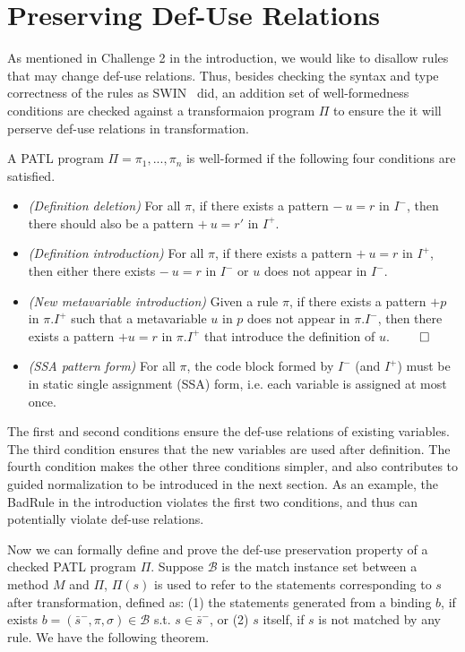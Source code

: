 \documentclass[letterpaper, USenglish]{lipics-v2016}
\newcommand{\PATL}{PATL\xspace}
\theoremstyle{plain}
\begin{document}

\section{Preserving Def-Use Relations}\label{sec:checker}
As mentioned in Challenge 2 in the introduction, we would like to
disallow rules that may change def-use relations. Thus, besides checking the syntax and type correctness of the rules as SWIN~\cite{Li:2015:STT:2678015.2682534} did, an addition set of well-formedness conditions are checked against a transformaion program $\Pi$ to ensure the it will perserve def-use relations in transformation.

\begin{definition}
A \PATL program $\Pi=\pi_1,...,\pi_n$ is well-formed if the following four conditions are satisfied.
\begin{itemize}
\item \textit{(Definition deletion)} For all $\pi$, if there exists a pattern $-~u=r$ in $I^-$, then there should also be a pattern $+~u=r'$ in $I^+$.
\item \textit{(Definition introduction)} For all $\pi$, if there exists a pattern $+~u=r$ in $I^+$, then either there exists $-~u=r$ in $I^-$ or $u$ does not appear in $I^-$.
\item \textit{(New metavariable introduction)} Given a rule $\pi$, if there exists a pattern $+p$ in $\pi.I^+$ such that a metavariable $u$ in $p$ does not appear in $\pi.I^-$, then there exists a pattern $+u=r$ in $\pi.I^+$ that introduce the definition of $u$. \hfill $\qed$
\item \textit{(SSA pattern form)} For all $\pi$, the code block formed
  by $I^-$ (and $I^+$) must be in static single
  assignment (SSA) form, i.e. each variable is assigned at most once.
\end{itemize}
\end{definition}

The first and second conditions ensure the def-use relations of
existing variables. The third condition ensures that the new variables are
used after definition. The fourth condition makes the other three
conditions simpler, and also contributes to guided normalization
to be introduced in the next section.
As an example, the BadRule in the introduction violates the first two conditions, and thus can potentially violate
def-use relations.

Now we can formally define and prove the def-use preservation property
of a checked \PATL program $\Pi$. Suppose $\mathcal{B}$ is the match
instance set between a method $M$ and $\Pi$, $\Pi(s)$ is used to refer
to the statements corresponding to $s$ after transformation, defined
as: (1) the statements generated from a binding $b$, if exists
$b=(\bar{s}^-,\pi,\sigma)\in \mathcal{B}$ s.t. $s\in\bar{s}^-$,  or (2)
$s$ itself, if $s$ is not matched by any rule. We have the following theorem.
\end{document}
